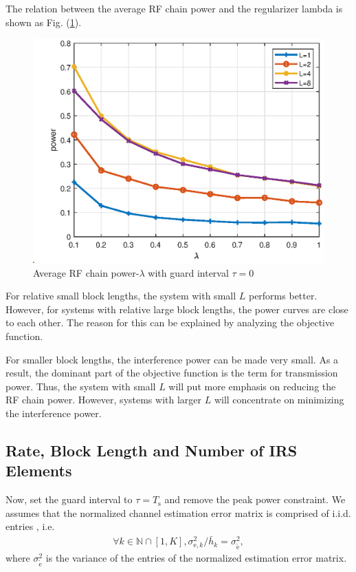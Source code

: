 \documentclass[12pt,draftclsnofoot,onecolumn,journal]{IEEEtran}
\begin{document}
The relation between the average RF chain power and the regularizer lambda is shown as Fig. (\ref{fig:powerlambda}).
\begin{figure}[htbp]\flushleft
\includegraphics[width=6in]{lmdpower.eps} 
\caption{Average RF chain power-$\lambda$ with guard interval $\tau=0$} \label{fig:powerlambda}
\end{figure}
For relative small block lengths, the system with small $L$ performs better. However, for systems with relative large block lengths, the power curves are close to each other. The reason for this can be explained by analyzing the objective function. 

For smaller block lengths, the interference power can be made very small. As a result, the dominant part of the objective function is the term for transmission power. Thus, the system with small $L$ will put more emphasis on reducing the RF chain power. However, systems with larger $L$ will concentrate on minimizing the interference power. 

\subsection{Rate, Block Length and Number of IRS Elements}
Now, set the guard interval to $\tau=T_{\mathrm{s}}$ and remove the peak power constraint. We assumes that the normalized channel estimation error matrix is comprised of i.i.d. entries \cite{zetterberg2011experimental}, i.e. 
\begin{equation}
\begin{split}
\forall k\in\mathbb N\cap[1, K], \sigma_{\mathrm{e},{k}}^2/\bar{h}_k=\sigma_{\tilde{\mathrm e}}^2,
\end{split}
\end{equation}
where $\sigma_{\tilde{\mathrm e}}^2$ is the variance of the entries of the normalized estimation error matrix.
\end{document}
